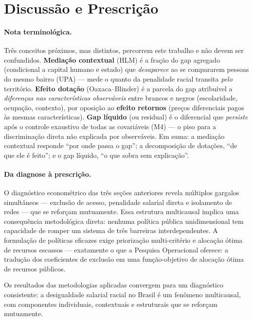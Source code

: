 \documentclass[12pt, a4paper, oneside]{article}
\begin{document}
\section{Discussão e Prescrição}
\label{sec:discussao}

\paragraph{Nota terminológica.}
Três conceitos próximos, mas distintos, percorrem este trabalho e não devem ser
confundidos. \textbf{Mediação contextual} (HLM) é a fração do gap agregado
(condicional a capital humano e estado) que \textit{desaparece} ao se compararem
pessoas do mesmo bairro (UPA) --- mede o quanto da penalidade racial transita
\textit{pelo} território.
\textbf{Efeito dotação} (Oaxaca--Blinder) é a parcela do gap atribuível a
\textit{diferenças nas características observáveis} entre brancos e negros
(escolaridade, ocupação, contexto), por oposição ao \textbf{efeito retornos}
(preços diferenciais pagos às mesmas características).
\textbf{Gap líquido} (ou residual) é o diferencial que \textit{persiste} após
o controle exaustivo de todas as covariáveis (M4) --- o piso para a discriminação
direta não explicada por observáveis. Em suma: a mediação contextual responde
``por onde passa o gap''; a decomposição de dotações, ``de que ele é feito''; e o
gap líquido, ``o que sobra sem explicação''.

\paragraph{Da diagnose à prescrição.}
O diagnóstico econométrico das três seções anteriores revela múltiplos
gargalos simultâneos --- exclusão de acesso, penalidade salarial direta
e isolamento de redes --- que se reforçam mutuamente.
Essa estrutura multicausal implica uma consequência metodológica direta:
nenhuma política pública unidimensional tem capacidade de romper um
sistema de três barreiras interdependentes.
A formulação de políticas eficazes exige priorização multi-critério
e alocação ótima de recursos escassos --- exatamente o que a Pesquisa
Operacional oferece: a tradução dos coeficientes de exclusão em uma
função-objetivo de alocação ótima de recursos públicos.

Os resultados das metodologias aplicadas convergem para um diagnóstico
consistente: a desigualdade salarial racial no Brasil é um fenômeno
multicausal, com componentes individuais, contextuais e estruturais
que se reforçam mutuamente.
\end{document}

